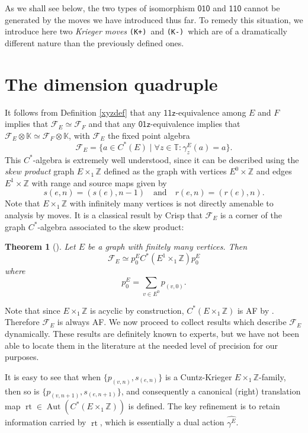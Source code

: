 \documentclass[12pt]{amsbook}%
\newcommand{\lt}{\operatorname{rt}}
\newtheorem{theor}{Theorem}[section]
\theoremstyle{defin}
\theoremstyle{remark}
\numberwithin{equation}{chapter}
\numberwithin{theor}{section}
\newcommand{\Ff}{\mathcal{F}}
\newcommand{\K}{\mathbb{K}}
\newcommand{\TT}{\mathbb{T}}
\newcommand{\ZZ}{\mathbb{Z}}
\newcommand{\xyz}[1]{\mbox{$\mathsf{#1}$}}
\newcommand{\KKKp}{\mbox{\texttt{\textup{(K+)}}}}
\newcommand{\KKKm}{\mbox{\texttt{\textup{(K-)}}}}
\begin{document}
As we shall see below, the two types of isomorphism \xyz{010} and \xyz{110} cannot be generated by the moves we have introduced thus far. To remedy this situation, we introduce here two \emph{Krieger moves} \KKKp\ and  \KKKm\ which are of a dramatically different nature than the previously defined ones.

\section{The dimension quadruple}



It follows from Definition \ref{xyzdef} that any  \xyz{11z}-equivalence among $E$ and $F$ implies that $\Ff_E\simeq \Ff_F$ and that any 
 \xyz{01z}-equivalence implies that $\Ff_E\otimes \K\simeq \Ff_F\otimes \K$, with  $\Ff_E$ the fixed point algebra
 \[
 \Ff_E=\{a\in C^*(E)\mid \forall z\in \TT:\gamma^E_z(a)=a\}.
 \]
This $C^*$-algebra is extremely well understood, since it can be described using the \emph{skew product} graph 
 $E\times_1\ZZ$ defined as  the graph with vertices $E^0 \times \ZZ$ and edges $E^1 \times \ZZ$ with range and source maps given by 
\[
s( e, n) = ( s(e), n-1) \quad \text{and} \quad r( e, n) = ( r(e), n ).
\]
Note that $E\times_1 \ZZ$ with infinitely many vertices is not directly amenable to analysis by moves. It is a classical result by Crisp that  $\Ff_E$ is a corner  of the graph $C^*$-algebra associated to the skew product:

\begin{theor}[\cite{tc:cga}]\label{tyrone}
Let $E$ be a graph with finitely many vertices. Then
\[
\Ff_E\simeq p_0^E C^*(E^1 \times_1 \ZZ)p_0^E
\]
where
\[
p_0^E=\sum_{v\in E^0}p_{(v,0)}.
\]
\end{theor}

Note that since $E\times _1\ZZ$ is acyclic by construction, $C^*(E\times_1 \ZZ)$ is AF by  \cite[Corollary~2.13]{ddmt:cag}. Therefore $\Ff_E$ is always AF.  We now proceed to collect results which describe $\Ff_E$ dynamically. These results are definitely known to experts, but we have not been able to locate them in the literature at the needed level of precision for our purposes.

It is easy to see that when $\{p_{(v,n)},s_{(e,n)}\}$ is a Cuntz-Krieger $E\times_1\ZZ$-family, then so is $\{p_{(v,n+1)},s_{(e,n+1)}\}$, and consequently a canonical (right) translation map $\lt\in\operatorname{Aut}(C^*(E\times_1\ZZ))$ is defined.\index{rt@$\lt$}
The key refinement is to retain information carried by $\lt$, which is essentially a dual action $\widehat{\gamma^E}$. 
 
\end{document}
